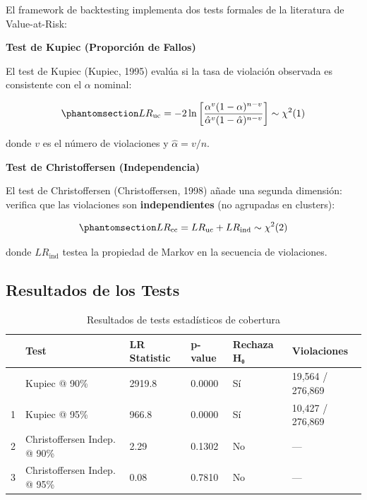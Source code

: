 \documentclass[
  spanish,
  11pt,
  letterpaper,
]{scrbook}
\theoremstyle{plain}
\theoremstyle{remark}
\begin{document}
El framework de backtesting implementa dos tests formales de la
literatura de Value-at-Risk:

\textbf{Test de Kupiec (Proporción de Fallos)}

El test de Kupiec (Kupiec, 1995) evalúa si la tasa de violación
observada es consistente con el \(\alpha\) nominal:

\begin{equation}\protect\phantomsection\label{eq-kupiec}{
LR_\text{uc} = -2\ln\left[\frac{\alpha^v (1-\alpha)^{n-v}}{\hat{\alpha}^v (1-\hat{\alpha})^{n-v}}\right] \sim \chi^2(1)
}\end{equation}

donde \(v\) es el número de violaciones y \(\hat{\alpha} = v/n\).

\textbf{Test de Christoffersen (Independencia)}

El test de Christoffersen (Christoffersen, 1998) añade una segunda
dimensión: verifica que las violaciones son \textbf{independientes} (no
agrupadas en clusters):

\begin{equation}\protect\phantomsection\label{eq-christoffersen}{
LR_\text{cc} = LR_\text{uc} + LR_\text{ind} \sim \chi^2(2)
}\end{equation}

donde \(LR_\text{ind}\) testea la propiedad de Markov en la secuencia de
violaciones.

\subsection{Resultados de los Tests}\label{resultados-de-los-tests}

{

\begin{longtable}[]{@{}llllll@{}}

\caption{\label{tbl-statistical-tests}Resultados de tests estadísticos
de cobertura}

\tabularnewline

\toprule\noalign{}
& Test & LR Statistic & p-value & Rechaza H₀ & Violaciones \\
\midrule\noalign{}
\endhead
\bottomrule\noalign{}
\endlastfoot
0 & Kupiec @ 90\% & 2919.8 & 0.0000 & Sí & 19,564 / 276,869 \\
1 & Kupiec @ 95\% & 966.8 & 0.0000 & Sí & 10,427 / 276,869 \\
2 & Christoffersen Indep. @ 90\% & 2.29 & 0.1302 & No & --- \\
3 & Christoffersen Indep. @ 95\% & 0.08 & 0.7810 & No & --- \\

\end{longtable}

}
\end{document}
